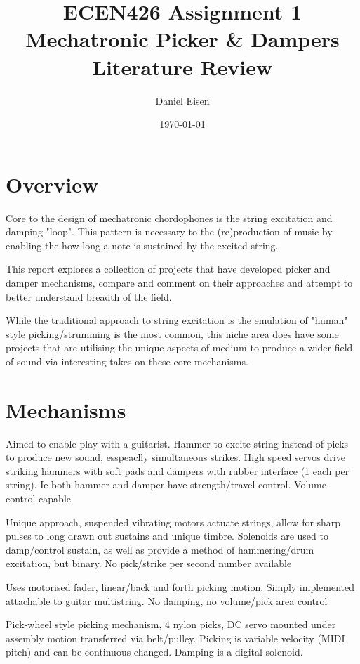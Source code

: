 \documentclass[11pt]{article}
\title{ECEN426 Assignment 1 \\ Mechatronic Picker \& Dampers Literature Review}
\author{Daniel Eisen}
\date{\today}
\begin{document}
\maketitle
\section{Overview}
Core to the design of mechatronic chordophones is the string excitation and damping "loop". This pattern is necessary to the (re)production of music by enabling the how long a note is sustained by the excited string.

This report explores a collection of projects that have developed picker and damper mechanisms, compare and comment on their approaches and attempt to better understand breadth of the field.

While the traditional approach to string excitation is the emulation of "human" style picking/strumming is the most common, this niche area does have some projects that are utilising the unique aspects of medium to produce a wider field of sound via interesting takes on these core mechanisms.


\section{Mechanisms}

\cite{hammer} Aimed to enable play with a guitarist. Hammer to excite string instead of picks to produce new sound, esspeaclly simultaneous strikes. High speed servos drive striking hammers with soft pads and dampers with rubber interface (1 each per string). Ie both hammer and damper have strength/travel control. Volume control capable

\cite{vibe_harp} Unique approach, suspended vibrating motors actuate strings, allow for sharp pulses to long drawn out sustains and unique timbre. Solenoids are used to damp/control sustain, as well as provide a method of hammering/drum excitation, but binary. No pick/strike per second number available 

\cite{actuated} Uses motorised fader, linear/back and forth picking motion. Simply implemented attachable to guitar multistring. No damping, no volume/pick area control 

\cite{singer} Pick-wheel style picking mechanism, 4 nylon picks, DC servo mounted under assembly motion transferred via belt/pulley. Picking is variable velocity (MIDI pitch) and can be continuous changed. Damping is a digital solenoid.
\end{document}
